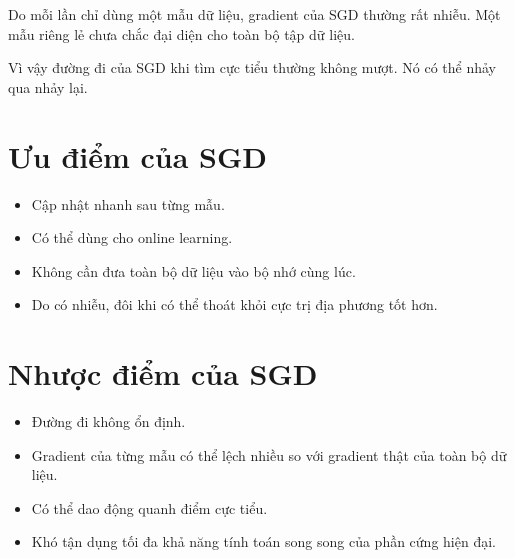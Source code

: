 \documentclass[12pt,a4paper]{report}
\begin{document}
Do mỗi lần chỉ dùng một mẫu dữ liệu, gradient của SGD thường rất nhiễu. Một mẫu riêng lẻ chưa chắc đại diện cho toàn bộ tập dữ liệu.

Vì vậy đường đi của SGD khi tìm cực tiểu thường không mượt. Nó có thể nhảy qua nhảy lại.

\begin{center}
\end{center}

\section{Ưu điểm của SGD}

\begin{itemize}
    \item Cập nhật nhanh sau từng mẫu.
    \item Có thể dùng cho online learning.
    \item Không cần đưa toàn bộ dữ liệu vào bộ nhớ cùng lúc.
    \item Do có nhiễu, đôi khi có thể thoát khỏi cực trị địa phương tốt hơn.
\end{itemize}

\section{Nhược điểm của SGD}

\begin{itemize}
    \item Đường đi không ổn định.
    \item Gradient của từng mẫu có thể lệch nhiều so với gradient thật của toàn bộ dữ liệu.
    \item Có thể dao động quanh điểm cực tiểu.
    \item Khó tận dụng tối đa khả năng tính toán song song của phần cứng hiện đại.
\end{itemize}
\end{document}
